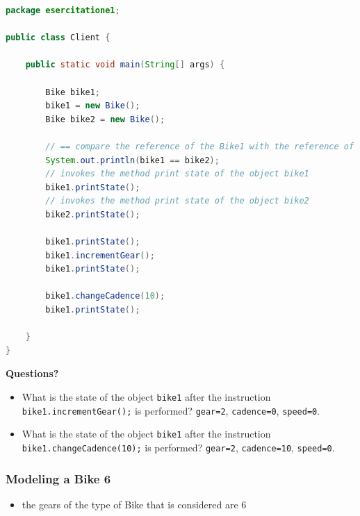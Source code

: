 \documentclass{article}
\theoremstyle{definition}
\begin{document}
\begin{lstlisting}[language=Java,escapechar=|]
package esercitatione1;

public class Client {

	public static void main(String[] args) {

		Bike bike1;
		bike1 = new Bike();
		Bike bike2 = new Bike();

		// == compare the reference of the Bike1 with the reference of the Bike2
		System.out.println(bike1 == bike2);
		// invokes the method print state of the object bike1
		bike1.printState();
		// invokes the method print state of the object bike2
		bike2.printState();

		bike1.printState();
		bike1.incrementGear();
		bike1.printState();
		
		bike1.changeCadence(10);
		bike1.printState();
		
	}
}
\end{lstlisting}

\textbf{Questions?}\\
\begin{itemize}
\item What is  the state of the object \texttt{bike1} after the instruction  \texttt{bike1.incrementGear();} is performed? 
\texttt{gear=2}, \texttt{cadence=0}, \texttt{speed=0}.
\item What is  the state of the object \texttt{bike1} after the instruction  \texttt{bike1.changeCadence(10);} is performed? 
\texttt{gear=2}, \texttt{cadence=10}, \texttt{speed=0}.
\end{itemize}

\subsubsection{Modeling a Bike 6}
\begin{itemize}
\item the gears of the type of Bike that is considered are $6$ 
\end{itemize}
\end{document}
